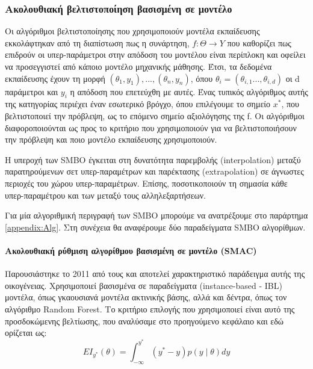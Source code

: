  \subsubsection{Ακολουθιακή βελτιστοποίηση βασισμένη σε μοντέλο} \label{section:SMBO}
 Οι αλγόριθμοι βελτιστοποίησης που χρησιμοποιούν μοντέλα εκπαίδευσης εκκολάφτηκαν από τη διαπίστωση πως η συνάρτηση, $f: \Theta \rightarrow Y$ που καθορίζει πως επιδρούν οι υπερ-παράμετροι στην απόδοση του μοντέλου είναι περίπλοκη και οφείλει να προσεγγιστεί από κάποιο μοντέλο μηχανικής μάθησης. Έτσι, τα δεδομένα εκπαίδευσης έχουν τη μορφή ${(\theta_1,y_1),...,(\theta_n,y_n)}$, όπου $\theta_i=(\theta_{i,1}..., \theta_{i,d})$ οι d παράμετροι και $y_i$ η απόδοση που επετεύχθη με αυτές. Ένας τυπικός αλγόριθμος αυτής της κατηγορίας περιέχει έναν εσωτερικό βρόγχο, όπου επιλέγουμε το σημείο $x^*$, που βελτιστοποιεί την πρόβλεψη, ως το επόμενο σημείο αξιολόγησης της f. Οι αλγόριθμοι διαφοροποιούνται ως προς το κριτήριο που χρησιμοποιούν για να βελτιστοποιήσουν την πρόβλεψη και ποιο μοντέλο εκπαίδευσης χρησιμοποιούν.
 
 Η υπεροχή των \gls{SMBO} έγκειται στη δυνατότητα παρεμβολής (interpolation) μεταξύ παρατηρούμενων σετ υπερ-παραμέτρων και παρέκτασης (extrapolation) σε άγνωστες περιοχές του χώρου υπερ-παραμέτρων. Επίσης, ποσοτικοποιούν τη σημασία κάθε υπερ-παραμέτρου και των μεταξύ τους αλληλεξαρτήσεων. 
 
 Για μία αλγοριθμική περιγραφή των SMBO μπορούμε να ανατρέξουμε στο παράρτημα \ref{appendix:Alg}. Στη συνέχεια θα αναφέρουμε δύο παραδείγματα SMBO αλγορίθμων.
 
 \paragraph{Ακολουθιακή ρύθμιση αλγορίθμου βασισμένη σε μοντέλο (SMAC)} Παρουσιάστηκε το 2011 από τους \citet{Hutter2011} και αποτελεί χαρακτηριστικό παράδειγμα αυτής της οικογένειας. Χρησιμοποιεί  βασισμένα σε παραδείγματα (instance-based - \gls{IBL}) μοντέλα, όπως γκαουσιανά  μοντέλα ακτινικής βάσης, αλλά και δέντρα, όπως τον αλγόριθμο Random Forest. Το κριτήριο επιλογής που χρησιμοποιεί είναι αυτό της προσδοκώμενης βελτίωσης, που αναλύσαμε στο προηγούμενο κεφάλαιο και εδώ ορίζεται ως:
 \begin{equation}
EI_{y^*} (\theta)= \int_{- \infty}^{y^*} (y^* - y) p(y \mid \theta) dy
 \end{equation}
